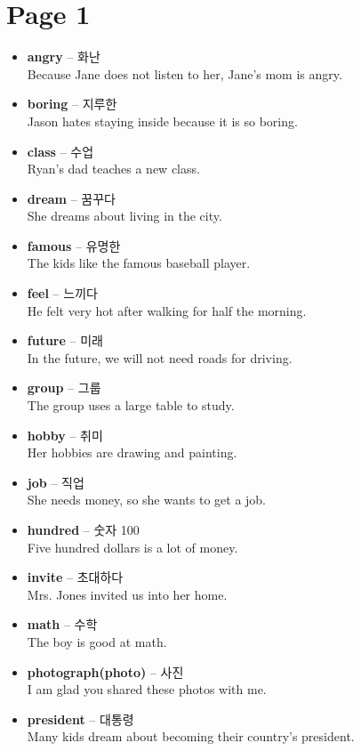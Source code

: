 \documentclass[12pt]{article}
\begin{document}
\section*{Page 1}
\begin{itemize}
    \item \textbf{angry} -- 화난 \\
    Because Jane does not listen to her, Jane's mom is angry.
    \item \textbf{boring} -- 지루한 \\
    Jason hates staying inside because it is so boring.
    \item \textbf{class} -- 수업 \\
    Ryan's dad teaches a new class.
    \item \textbf{dream} -- 꿈꾸다 \\
    She dreams about living in the city.
    \item \textbf{famous} -- 유명한 \\
    The kids like the famous baseball player.
    \item \textbf{feel} -- 느끼다 \\
    He felt very hot after walking for half the morning.
    \item \textbf{future} -- 미래 \\
    In the future, we will not need roads for driving.
    \item \textbf{group} -- 그룹 \\
    The group uses a large table to study.
    \item \textbf{hobby} -- 취미 \\
    Her hobbies are drawing and painting.
    \item \textbf{job} -- 직업 \\
    She needs money, so she wants to get a job.
    \item \textbf{hundred} -- 숫자 100 \\
    Five hundred dollars is a lot of money.
    \item \textbf{invite} -- 초대하다 \\
    Mrs. Jones invited us into her home.
    \item \textbf{math} -- 수학 \\
    The boy is good at math.
    \item \textbf{photograph(photo)} -- 사진 \\
    I am glad you shared these photos with me.
    \item \textbf{president} -- 대통령 \\
    Many kids dream about becoming their country's president.
\end{itemize}
\end{document}
